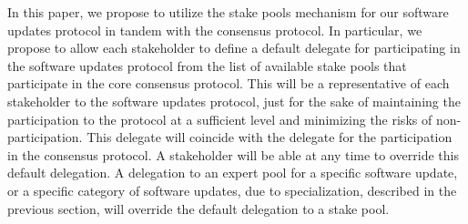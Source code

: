 In this paper, we propose to utilize the stake pools mechanism for our software updates protocol in tandem with the consensus protocol. In particular, we propose to allow each stakeholder to define a default delegate for participating in the software updates protocol from the list of available stake pools that participate in the core consensus protocol. This will be a  representative of each stakeholder to the software updates protocol, just for the sake of maintaining the participation to the protocol at a sufficient level and minimizing the risks of non-participation. This delegate will coincide with the delegate for the participation in the consensus protocol. A stakeholder will be able at any time to override this default delegation. A delegation to an expert pool for a specific software update, or a specific category of software updates, due to specialization, described in the previous section, will override the default delegation to a stake pool. 



